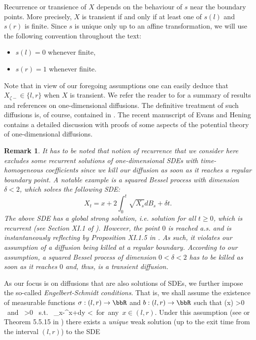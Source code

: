\documentclass[11pt,reqno]{amsart}
\numberwithin{equation}{section}
\newtheorem{remark}{Remark}[section]
\begin{document}
Recurrence or transience of $X$ depends on the behaviour of $s$ near the boundary points. More precisely, $X$ is transient if and only if at least one of $s(l)$ and $s(r)$ is finite. Since $s$ is unique only up to an affine transformation, we will use the following convention throughout the text: 
\begin{itemize}
	\item $s(l)=0$ whenever finite,
	\item  $s(r)=1$ whenever finite.
\end{itemize} 
Note that in view of our foregoing assumptions one can easily deduce that $X_{\zeta -}\in \{l,r\}$ when $X$ is transient. We refer the reader to \cite{BorSal} for a summary of results and references on one-dimensional diffusions. The definitive treatment of such diffusions is, of course, contained in \cite{IM}. The recent manuscript of Evans and Hening \cite{EH} contains a detailed discussion with proofs of some aspects of the potential theory of one-dimensional diffusions.
\begin{remark} It has to be noted that notion of recurrence that we consider here excludes some recurrent solutions of one-dimensional SDEs with time-homogeneous coefficients since we kill our diffusion as soon as it reaches a regular boundary point. A notable example is a squared Bessel process with  dimension $\delta <2$, which solves the following SDE:
\[
X_t= x+2 \int_0^t\sqrt{X_s}dB_s +\delta t.
\]
The above SDE has a global strong solution, i.e. solution for all $t \geq 0$, which is recurrent (see Section XI.1 of \cite{RY}). However, the point $0$ is reached a.s. and is instantaneously reflecting by Proposition XI.1.5 in  \cite{RY}. As such, it violates our assumption of a diffusion being killed at a regular boundary. According to  our assumption, a squared Bessel process of dimension $0<\delta<2$ has to be killed as soon as it reaches $0$ and, thus, is a {\em transient} diffusion. 
\end{remark}
As our focus is on diffusions that are also solutions of SDEs, we further impose the so-called {\em Engelbert-Schmidt conditions}. That is, we shall assume the existence of measurable functions $\sigma:(l,r)\to \bbR$ and $b: (l,r)\to \bbR$ such that 
\be \label{e:ESR}
\sigma(x) >0  \mbox{ and } \exists \eps >0 \mbox{ s.t. } \int_{x-\eps}^{x+\eps}dy <\infty \mbox{ for any $x \in (l,r)$.}
\ee
Under this assumption (see \cite{ES} or Theorem 5.5.15 in \cite{KS}) there exists a {\em unique} weak solution (up to the exit time from the interval $(l,r)$) to the SDE
\end{document}
